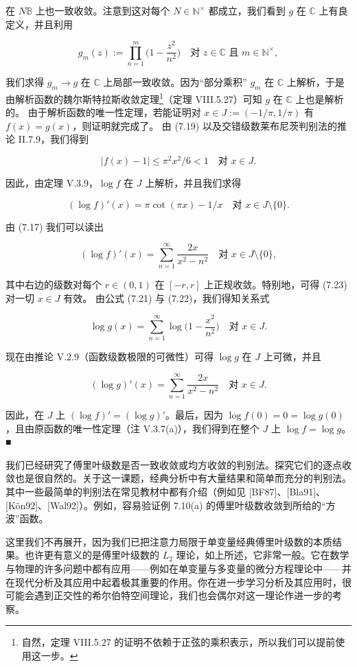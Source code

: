 \begin{application}
\begin{items}
在 $ N\mathbb{B} $ 上也一致收敛。注意到这对每个 $ N \in \mathbb{N}^{\times} $ 都成立，我们看到 $ g $ 在 $ \mathbb{C} $ 上有良定义，并且利用

\[
g_{m}(z) := \prod_{n=1}^{m}\Big(1 - \frac{z^{2}}{n^{2}}\Big) \quad \text{对 } z \in \mathbb{C} \text{ 且 } m \in \mathbb{N}^{\times} ,
\]

我们求得 $ g_{m} \to g $ 在 $ \mathbb{C} $ 上局部一致收敛。因为“部分乘积” $ g_{m} $ 在 $ \mathbb{C} $ 上解析，于是由解析函数的魏尔斯特拉斯收敛定理\footnote{自然，定理 VIII.5.27 的证明不依赖于正弦的乘积表示，所以我们可以提前使用这一步。}（定理 VIII.5.27）可知 $ g $ 在 $ \mathbb{C} $ 上也是解析的。
由于解析函数的唯一性定理，若能证明对 $ x \in J := (-1/\pi, 1/\pi) $ 有 $ f(x) = g(x) $，则证明就完成了。
由 (7.19) 以及交错级数莱布尼茨判别法的推论 II.7.9，我们得到

\[
|f(x) - 1| \le \pi^{2}x^{2}/6 < 1 \quad \text{对 } x \in J .
\]

因此，由定理 V.3.9，$ \log f $ 在 $ J $ 上解析，并且我们求得

\[
(\log f)'(x) = \pi\cot(\pi x) - 1/x \quad \text{对 } x \in J \setminus\{0\} .
\]

由 (7.17) 我们可以读出

\begin{equation}
(\log f)'(x) = \sum_{n=1}^{\infty}\frac{2x}{x^{2} - n^{2}} \quad \text{对 } x \in J \setminus\{0\} ,\tag{7.23}
\end{equation}

其中右边的级数对每个 $ r \in (0, 1) $ 在 $ [-r, r] $ 上正规收敛。特别地，可得 (7.23) 对一切 $ x \in J $ 有效。
由公式 (7.21) 与 (7.22)，我们得知关系式

\[
\log g(x) = \sum_{n=1}^{\infty}\log\Big(1 - \frac{x^{2}}{n^{2}}\Big) \quad \text{对 } x \in J .
\]

现在由推论 V.2.9（函数级数极限的可微性）可得 $ \log g $ 在 $ J $ 上可微，并且

\[
(\log g)'(x) = \sum_{n=1}^{\infty}\frac{2x}{x^{2} - n^{2}} \quad \text{对 } x \in J .
\]

因此，在 $ J $ 上 $ (\log f)' = (\log g)' $。最后，因为 $ \log f(0) = 0 = \log g(0) $，且由原函数的唯一性定理（注 V.3.7(a)），我们得到在整个 $ J $ 上 $ \log f = \log g $。\nobreak\hspace{0.35em}■

\end{items}

我们已经研究了傅里叶级数是否一致收敛或均方收敛的判别法。探究它们的逐点收敛也是很自然的。关于这一课题，经典分析中有大量结果和简单而充分的判别法。其中一些最简单的判别法在常见教材中都有介绍（例如见 [BF87]、[Bla91]、[Kön92]、[Wal92]）。例如，容易验证例 7.10(a) 的傅里叶级数收敛到所给的“方波”函数。

这里我们不再展开，因为我们已把注意力局限于单变量经典傅里叶级数的本质结果。也许更有意义的是傅里叶级数的 $ L_{2} $ 理论，如上所述，它非常一般。它在数学与物理的许多问题中都有应用——例如在单变量与多变量的微分方程理论中——并在现代分析及其应用中起着极其重要的作用。你在进一步学习分析及其应用时，很可能会遇到正交性的希尔伯特空间理论，我们也会偶尔对这一理论作进一步的考察。

\end{application}

